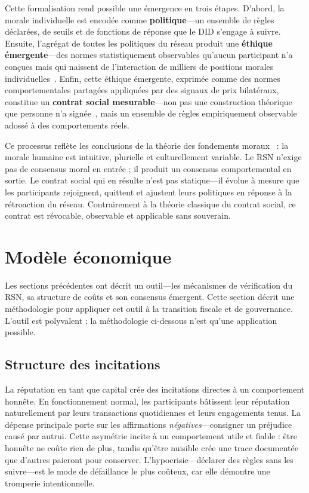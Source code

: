 \documentclass[11pt,a4paper,twocolumn]{article}
\begin{document}
Cette formalisation rend possible une émergence en trois étapes. D'abord, la morale individuelle est encodée comme \textbf{politique}---un ensemble de règles déclarées, de seuils et de fonctions de réponse que le DID s'engage à suivre. Ensuite, l'agrégat de toutes les politiques du réseau produit une \textbf{éthique émergente}---des normes statistiquement observables qu'aucun participant n'a conçues mais qui naissent de l'interaction de milliers de positions morales individuelles~\cite{durkheim1893}. Enfin, cette éthique émergente, exprimée comme des normes comportementales partagées appliquées par des signaux de prix bilatéraux, constitue un \textbf{contrat social mesurable}---non pas une construction théorique que personne n'a signée~\cite{rawls1971}, mais un ensemble de règles empiriquement observable adossé à des comportements réels.

Ce processus reflète les conclusions de la théorie des fondements moraux~\cite{haidt2012} : la morale humaine est intuitive, plurielle et culturellement variable. Le RSN n'exige pas de consensus moral en entrée ; il produit un consensus comportemental en sortie. Le contrat social qui en résulte n'est pas statique---il évolue à mesure que les participants rejoignent, quittent et ajustent leurs politiques en réponse à la rétroaction du réseau. Contrairement à la théorie classique du contrat social, ce contrat est révocable, observable et applicable sans souverain.

\section{Modèle économique}

Les sections précédentes ont décrit un outil---les mécanismes de vérification du RSN, sa structure de coûts et son consensus émergent. Cette section décrit une méthodologie pour appliquer cet outil à la transition fiscale et de gouvernance. L'outil est polyvalent ; la méthodologie ci-dessous n'est qu'une application possible.

\subsection{Structure des incitations}

La réputation en tant que capital crée des incitations directes à un comportement honnête. En fonctionnement normal, les participants bâtissent leur réputation naturellement par leurs transactions quotidiennes et leurs engagements tenus. La dépense principale porte sur les affirmations \emph{négatives}---consigner un préjudice causé par autrui. Cette asymétrie incite à un comportement utile et fiable : être honnête ne coûte rien de plus, tandis qu'être nuisible crée une trace documentée que d'autres paieront pour conserver. L'hypocrisie---déclarer des règles sans les suivre---est le mode de défaillance le plus coûteux, car elle démontre une tromperie intentionnelle.
\end{document}
